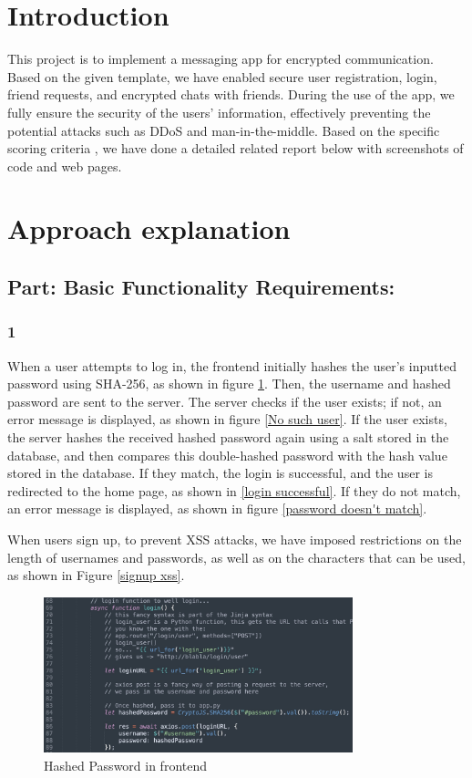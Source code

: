 \documentclass[12pt]{article}
\begin{document}
\section{Introduction}

This project is to implement a messaging app for encrypted communication. Based on the given template, we have enabled secure user registration, login, friend requests, and encrypted chats with friends. During the use of the app, we fully ensure the security of the users' information, effectively preventing the potential attacks such as DDoS and man-in-the-middle. Based on the specific scoring criteria , we have done a detailed related report below with screenshots of code and web pages.

\section{Approach explanation}
    \subsection*{Part: Basic Functionality Requirements:}
        \subsubsection*{1} When a user attempts to log in, the frontend initially hashes the user's inputted password using SHA-256, as shown in figure \ref{Hashed Password in frontend}. Then, the username and hashed password are sent to the server. The server checks if the user exists; if not, an error message is displayed, as shown in figure \ref{No such user}. If the user exists, the server hashes the received hashed password again using a salt stored in the database, and then compares this double-hashed password with the hash value stored in the database. If they match, the login is successful, and the user is redirected to the home page, as shown in \ref{login successful}. If they do not match, an error message is displayed, as shown in figure \ref{password doesn't match}.


        When users sign up, to prevent XSS attacks, we have imposed restrictions on the length of usernames and passwords, as well as on the characters that can be used, as shown in Figure \ref{signup xss}.

        \begin{figure}[H]
            \centering
            \includegraphics[width=0.8\textwidth]{graphs/front_login_hashed.jpg}
            \caption{Hashed Password in frontend}
            \label{Hashed Password in frontend}
        \end{figure}
\end{document}
